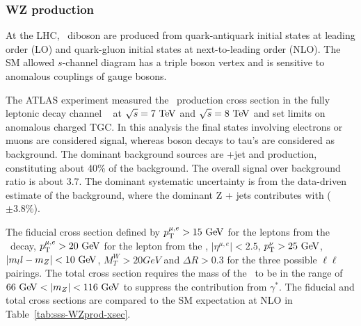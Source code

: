 \subsubsection{WZ production}

\label{sss-WZprod}

At the LHC, \WZ\ diboson are produced from quark-antiquark initial states at 
leading order (LO) and quark-gluon initial states at next-to-leading order 
(NLO). %
The SM allowed $s$-channel diagram has a triple boson vertex and is sensitive to 
anomalous couplings of gauge bosons.





The ATLAS experiment measured the \WZ\ production cross section in the fully 
leptonic decay channel \ll\lnu~\cite{Aad:2012twa} at $\rts = 7\TeV$ and $\rts = 8\TeV$ 
and set limits on anomalous charged TGC.
In this analysis the final states involving electrons or muons are considered signal,
whereas boson decays to tau's are considered as background.  
The dominant background sources are \Zboson+jet and \ZZ production, constituting about 40\% of 
the background. The overall signal over background ratio is about $3.7$.
The dominant systematic uncertainty is from the data-driven estimate of the   
background, where the dominant Z + jets contributes with ($\pm3.8\%$).

The fiducial cross section defined by $\pt^{\mu,e} > 15\GeV$ for the leptons from the \Zboson\ 
 decay, $\pt^{\mu,e} > 20\GeV$ for the lepton from the \Wboson, $|\eta^{\mu,e}|<2.5$, $\pt^\nu>25\GeV$,
 $|m_ll-m_Z| < 10\GeV$, $M_T^W>20GeV$ and $\Delta R> 0.3$ for the three possible $\ell\ell$ pairings. 
The total cross section requires the mass of the \Zboson\ to be in the range of $66\GeV < |m_Z| < 116\GeV$
to suppress the contribution from $\gamma^*$.
The fiducial and total cross sections are compared to the SM expectation at NLO in Table~\ref{tab:sss-WZprod-xsec}.

